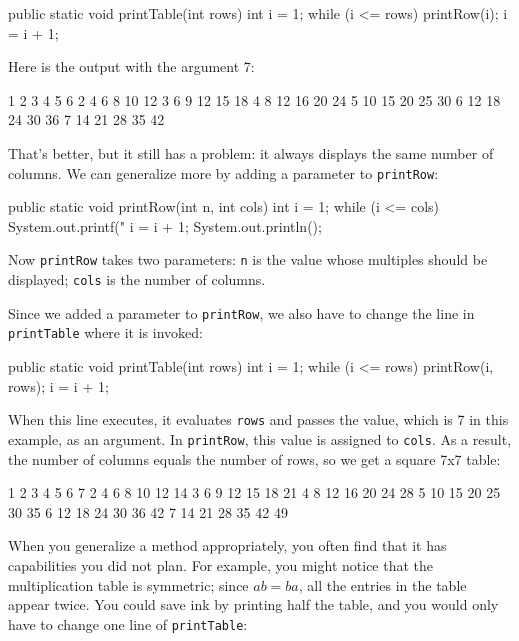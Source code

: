 \documentclass[12pt]{book}
\theoremstyle{exercise}
\newcommand{\java}[1]{\verb"#1"}
\begin{document}
\begin{code}
    public static void printTable(int rows) {
        int i = 1;
        while (i <= rows) {
            printRow(i);
            i = i + 1;
        }
    }
\end{code}

Here is the output with the argument 7:

\begin{stdout}
   1   2   3   4   5   6
   2   4   6   8  10  12
   3   6   9  12  15  18
   4   8  12  16  20  24
   5  10  15  20  25  30
   6  12  18  24  30  36
   7  14  21  28  35  42
\end{stdout}

That's better, but it still has a problem: it always displays the same number of columns.
We can generalize more by adding a parameter to \java{printRow}:

\begin{code}
    public static void printRow(int n, int cols) {
        int i = 1;
        while (i <= cols) {
            System.out.printf("%
            i = i + 1;
        }
        System.out.println();
    }
\end{code}

Now \java{printRow} takes two parameters: \java{n} is the value whose multiples should be displayed; \java{cols} is the number of columns.

Since we added a parameter to \java{printRow}, we also have to change the line in \java{printTable} where it is invoked:

\begin{code}
    public static void printTable(int rows) {
        int i = 1;
        while (i <= rows) {
            printRow(i, rows);
            i = i + 1;
        }
    }
\end{code}

When this line executes, it evaluates \java{rows} and passes the value, which is 7 in this example, as an argument.
In \java{printRow}, this value is assigned to \java{cols}.
As a result, the number of columns equals the number of rows, so we get a square 7x7 table:

\begin{stdout}
   1   2   3   4   5   6   7
   2   4   6   8  10  12  14
   3   6   9  12  15  18  21
   4   8  12  16  20  24  28
   5  10  15  20  25  30  35
   6  12  18  24  30  36  42
   7  14  21  28  35  42  49
\end{stdout}

When you generalize a method appropriately, you often find that it has capabilities you did not plan.
For example, you might notice that the multiplication table is symmetric; since $ab = ba$, all the entries in the table appear twice.
You could save ink by printing half the table, and you would only have to change one line of \java{printTable}:
\end{document}
